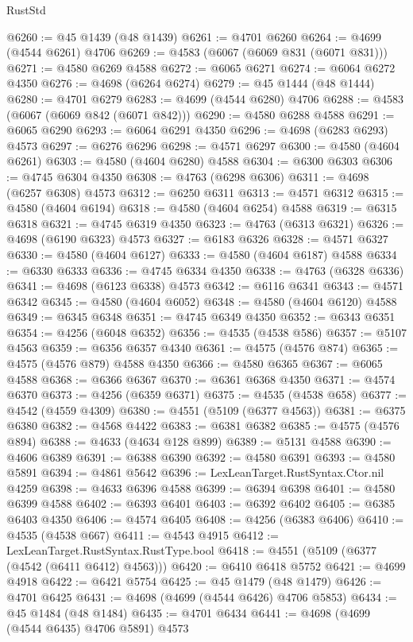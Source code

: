 \begin{lexlean}{RustStd}
\begin{coremodule}
@6260 := @45 @1439 (@48 @1439)
@6261 := @4701 @6260
@6264 := @4699 (@4544 @6261) @4706
@6269 := @4583 (@6067 (@6069 @831 (@6071 @831)))
@6271 := @4580 @6269 @4588
@6272 := @6065 @6271
@6274 := @6064 @6272 @4350
@6276 := @4698 (@6264 @6274)
@6279 := @45 @1444 (@48 @1444)
@6280 := @4701 @6279
@6283 := @4699 (@4544 @6280) @4706
@6288 := @4583 (@6067 (@6069 @842 (@6071 @842)))
@6290 := @4580 @6288 @4588
@6291 := @6065 @6290
@6293 := @6064 @6291 @4350
@6296 := @4698 (@6283 @6293) @4573
@6297 := @6276 @6296
@6298 := @4571 @6297
@6300 := @4580 (@4604 @6261)
@6303 := @4580 (@4604 @6280) @4588
@6304 := @6300 @6303
@6306 := @4745 @6304 @4350
@6308 := @4763 (@6298 @6306)
@6311 := @4698 (@6257 @6308) @4573
@6312 := @6250 @6311
@6313 := @4571 @6312
@6315 := @4580 (@4604 @6194)
@6318 := @4580 (@4604 @6254) @4588
@6319 := @6315 @6318
@6321 := @4745 @6319 @4350
@6323 := @4763 (@6313 @6321)
@6326 := @4698 (@6190 @6323) @4573
@6327 := @6183 @6326
@6328 := @4571 @6327
@6330 := @4580 (@4604 @6127)
@6333 := @4580 (@4604 @6187) @4588
@6334 := @6330 @6333
@6336 := @4745 @6334 @4350
@6338 := @4763 (@6328 @6336)
@6341 := @4698 (@6123 @6338) @4573
@6342 := @6116 @6341
@6343 := @4571 @6342
@6345 := @4580 (@4604 @6052)
@6348 := @4580 (@4604 @6120) @4588
@6349 := @6345 @6348
@6351 := @4745 @6349 @4350
@6352 := @6343 @6351
@6354 := @4256 (@6048 @6352)
@6356 := @4535 (@4538 @586)
@6357 := @5107 @4563
@6359 := @6356 @6357 @4340
@6361 := @4575 (@4576 @874)
@6365 := @4575 (@4576 @879) @4588 @4350
@6366 := @4580 @6365
@6367 := @6065 @4588
@6368 := @6366 @6367
@6370 := @6361 @6368 @4350
@6371 := @4574 @6370
@6373 := @4256 (@6359 @6371)
@6375 := @4535 (@4538 @658)
@6377 := @4542 (@4559 @4309)
@6380 := @4551 (@5109 (@6377 @4563))
@6381 := @6375 @6380
@6382 := @4568 @4422
@6383 := @6381 @6382
@6385 := @4575 (@4576 @894)
@6388 := @4633 (@4634 @128 @899)
@6389 := @5131 @4588
@6390 := @4606 @6389
@6391 := @6388 @6390
@6392 := @4580 @6391
@6393 := @4580 @5891
@6394 := @4861 @5642
@6396 := LexLeanTarget.RustSyntax.Ctor.nil @4259
@6398 := @4633 @6396 @4588
@6399 := @6394 @6398
@6401 := @4580 @6399 @4588
@6402 := @6393 @6401
@6403 := @6392 @6402
@6405 := @6385 @6403 @4350
@6406 := @4574 @6405
@6408 := @4256 (@6383 @6406)
@6410 := @4535 (@4538 @667)
@6411 := @4543 @4915
@6412 := LexLeanTarget.RustSyntax.RustType.bool
@6418 := @4551 (@5109 (@6377 (@4542 (@6411 @6412) @4563)))
@6420 := @6410 @6418 @5752
@6421 := @4699 @4918
@6422 := @6421 @5754
@6425 := @45 @1479 (@48 @1479)
@6426 := @4701 @6425
@6431 := @4698 (@4699 (@4544 @6426) @4706 @5853)
@6434 := @45 @1484 (@48 @1484)
@6435 := @4701 @6434
@6441 := @4698 (@4699 (@4544 @6435) @4706 @5891) @4573

\end{coremodule}
\end{lexlean}
